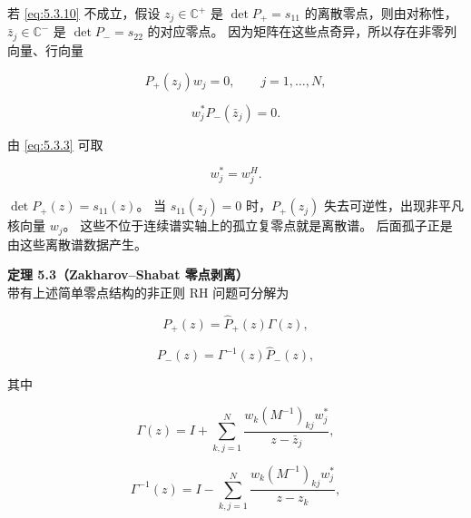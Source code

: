 \documentclass[
    lang=cn,
    scheme=chinese,
    mode=simple,
    device=normal,
    color=blue,
    math=cm,
    thmcnt=section,
    12pt,
    nowatermark
]{elegantbook}
\begin{document}
若 \eqref{eq:5.3.10} 不成立，假设 $z_j\in\mathbb{C}^+$ 是 $\det P_+=s_{11}$ 的离散零点，则由对称性，$\bar z_j\in\mathbb{C}^-$ 是 $\det P_-=s_{22}$ 的对应零点。
因为矩阵在这些点奇异，所以存在非零列向量、行向量

\begin{equation}
    P_+(z_j)w_j=0,
    \qquad j=1,\ldots,N,
    \tag{5.3.11}
    \label{eq:5.3.11}
\end{equation}

\begin{equation}
    w_j^*P_-(\bar z_j)=0.
    \tag{5.3.12}
    \label{eq:5.3.12}
\end{equation}

由 \eqref{eq:5.3.3} 可取

\begin{equation}
    w_j^*=w_j^H.
    \tag{5.3.13}
    \label{eq:5.3.13}
\end{equation}

\begin{callout}
    $\det P_+(z)=s_{11}(z)$。
    当 $s_{11}(z_j)=0$ 时，$P_+(z_j)$ 失去可逆性，出现非平凡核向量 $w_j$。
    这些不位于连续谱实轴上的孤立复零点就是离散谱。
    后面孤子正是由这些离散谱数据产生。
\end{callout}

\textbf{定理 5.3（Zakharov--Shabat 零点剥离）}\\
带有上述简单零点结构的非正则 RH 问题可分解为

\begin{equation}
    P_+(z)
    =
    \widehat P_+(z)\Gamma(z),
    \tag{5.3.14}
    \label{eq:5.3.14}
\end{equation}

\begin{equation}
    P_-(z)
    =
    \Gamma^{-1}(z)\widehat P_-(z),
    \tag{5.3.15}
    \label{eq:5.3.15}
\end{equation}

其中

\begin{equation}
    \Gamma(z)
    =
    I+
    \sum\limits_{k,j=1}^{N}
    \dfrac{
        w_k(M^{-1})_{kj}w_j^*
    }{
        z-\bar z_j
    },
    \tag{5.3.16}
    \label{eq:5.3.16}
\end{equation}

\begin{equation}
    \Gamma^{-1}(z)
    =
    I-
    \sum\limits_{k,j=1}^{N}
    \dfrac{
        w_k(M^{-1})_{kj}w_j^*
    }{
        z-z_k
    },
    \tag{5.3.17}
    \label{eq:5.3.17}
\end{equation}
\end{document}
